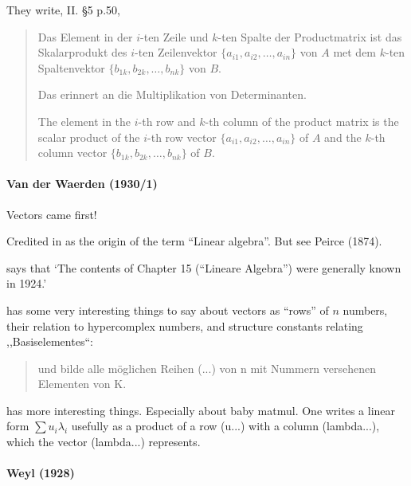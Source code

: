 They write, II. \S 5 p.50,

\begin{quote}
Das Element in der $i$-ten Zeile und $k$-ten Spalte der Productmatrix ist das
Skalarprodukt des $i$-ten Zeilenvektor $\{a_{i1}, a_{i2}, \dots, a_{in}\}$
von $A$ met dem $k$-ten Spaltenvektor $\{b_{1k}, b_{2k}, \dots, b_{nk}\}$ von $B$.

Das erinnert an die Multiplikation von Determinanten.

The element in the $i$-th row and $k$-th column of the product matrix is the
scalar product of the $i$-th row vector $\{a_{i1}, a_{i2}, \dots, a_{in}\}$ of $A$
and the $k$-th column vector $\{b_{1k}, b_{2k}, \dots, b_{nk}\}$ of $B$.
\end{quote}



\paragraph{Van der Waerden (1930/1)~\cite{vdWaerden1930,vdWaerden1931}}

Vectors came first!


Credited in \cite{Kleiner2007} as the origin of the term ``Linear algebra''. But
see Peirce (1874).

\cite[p. 36]{vdWaerden1975} says that `The contents of Chapter 15 (``Lineare Algebra'') were generally
known in 1924.'


\cite[\S 10, pp. 43-44]{vdWaerden1930} has some very interesting things to say
about vectors as ``rows'' of $n$ numbers, their relation to hypercomplex numbers,
and structure constants relating ,,Basiselementes``:

\begin{quote}
und bilde alle möglichen Reihen (...) von n
mit Nummern versehenen Elementen von K.


\end{quote}

\cite[\S 104, pp. 110. ff.]{vdWaerden1931} has more interesting things.
Especially about baby matmul.
One writes a linear form $\sum u_i \lambda_i$ usefully as a product of a row (u...) with a column (lambda...), which the vector (lambda...) represents.



\paragraph{Weyl (1928)~\cite{Weyl1928,Weyl1931}}

